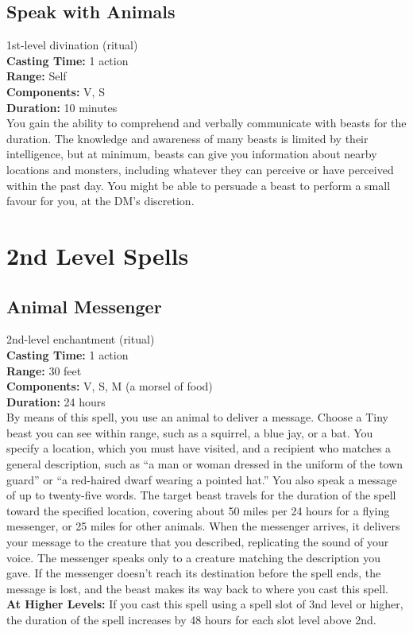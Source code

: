 \documentclass[11pt, A4paper, english]{article}
\begin{document}
		\subsection{Speak with Animals}
1st-level divination (ritual) \\
\textbf{Casting Time:} 1 action \\
\textbf{Range:} Self \\
\textbf{Components:} V, S \\
\textbf{Duration:} 10 minutes \\
You gain the ability to comprehend and verbally communicate with beasts for the duration. The knowledge and awareness of many beasts is limited by their intelligence, but at minimum, beasts can give you information about nearby locations and monsters, including whatever they can perceive or have perceived within the past day. You might be able to persuade a beast to perform a small favour for you, at the DM's discretion.



	\section{2nd Level Spells}
		\subsection{Animal Messenger}
2nd-level enchantment (ritual) \\
\textbf{Casting Time:} 1 action \\
\textbf{Range:} 30 feet \\
\textbf{Components:} V, S, M (a morsel of food) \\
\textbf{Duration:} 24 hours \\
By means of this spell, you use an animal to deliver a message. Choose a Tiny beast you can see within range, such as a squirrel, a blue jay, or a bat. You specify a location, which you must have visited, and a recipient who matches a general description, such as “a man or woman dressed in the uniform of the town guard” or “a red-haired dwarf wearing a pointed hat.” You also speak a message of up to twenty-five words. The target beast travels for the duration of the spell toward the specified location, covering about 50 miles per 24 hours for a flying messenger, or 25 miles for other animals. When the messenger arrives, it delivers your message to the creature that you described, replicating the sound of your voice. The messenger speaks only to a creature matching the description you gave. If the messenger doesn’t reach its destination before the spell ends, the message is lost, and the beast makes its way back to where you cast this spell. \\
\textbf{At Higher Levels:} If you cast this spell using a spell slot of 3nd level or higher, the duration of the spell increases by 48 hours for each slot level above 2nd.
\end{document}
